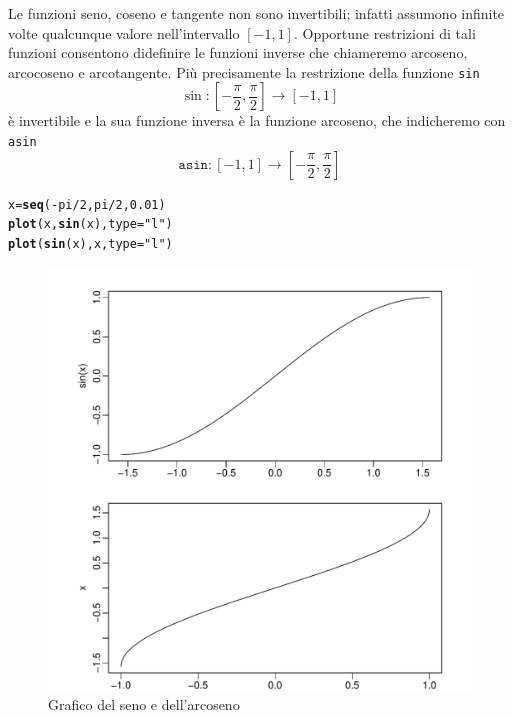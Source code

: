 \documentclass[onecolumn,11pt]{book}\usepackage[]{graphicx}\usepackage[]{color}
\makeatletter
\def\maxwidth{ %
  \ifdim\Gin@nat@width>\linewidth
    \linewidth
  \else
    \Gin@nat@width
  \fi
}
\newcommand{\hlnum}[1]{\textcolor[rgb]{0.686,0.059,0.569}{#1}}%
\newcommand{\hlstr}[1]{\textcolor[rgb]{0.192,0.494,0.8}{#1}}%
\newcommand{\hlopt}[1]{\textcolor[rgb]{0,0,0}{#1}}%
\newcommand{\hlstd}[1]{\textcolor[rgb]{0.345,0.345,0.345}{#1}}%
\newcommand{\hlkwb}[1]{\textcolor[rgb]{0.69,0.353,0.396}{#1}}%
\newcommand{\hlkwc}[1]{\textcolor[rgb]{0.333,0.667,0.333}{#1}}%
\newcommand{\hlkwd}[1]{\textcolor[rgb]{0.737,0.353,0.396}{\textbf{#1}}}%
\newenvironment{kframe}{%
 \def\at@end@of@kframe{}%
 \ifinner\ifhmode%
  \def\at@end@of@kframe{\end{minipage}}%
  \begin{minipage}{\columnwidth}%
 \fi\fi%
 \def\FrameCommand##1{\hskip\@totalleftmargin \hskip-\fboxsep
 \colorbox{shadecolor}{##1}\hskip-\fboxsep
     \hskip-\linewidth \hskip-\@totalleftmargin \hskip\columnwidth}%
 \MakeFramed {\advance\hsize-\width
   \@totalleftmargin\z@ \linewidth\hsize
   \@setminipage}}%
 {\par\unskip\endMakeFramed%
 \at@end@of@kframe}
\newenvironment{knitrout}{}{} %
\makeatother
\begin{document}
Le funzioni seno, coseno e tangente non sono invertibili; infatti assumono infinite volte qualcunque valore nell'intervallo $[-1,1]$.
Opportune restrizioni di tali funzioni consentono didefinire le funzioni inverse che chiameremo arcoseno, arcocoseno e arcotangente. Pi\`u precisamente
la restrizione della funzione \texttt{sin}
$$\sin\colon [-\frac{\pi}{2},\frac{\pi}{2}]\rightarrow [-1,1]$$
\`e invertibile e la sua funzione inversa \`e  la funzione arcoseno, che indicheremo con \texttt{asin}
$$\texttt{asin}\colon  [-1,1]\rightarrow [-\frac{\pi}{2},\frac{\pi}{2}]$$
\begin{knitrout}
\color{fgcolor}\begin{kframe}
\begin{alltt}
\hlstd{x}\hlkwb{=}\hlkwd{seq}\hlstd{(}\hlopt{-}\hlstd{pi}\hlopt{/}\hlnum{2}\hlstd{,pi}\hlopt{/}\hlnum{2}\hlstd{,}\hlnum{0.01}\hlstd{)}
\hlkwd{plot}\hlstd{(x,}\hlkwd{sin}\hlstd{(x),}\hlkwc{type}\hlstd{=}\hlstr{"l"}\hlstd{)}
\hlkwd{plot}\hlstd{(}\hlkwd{sin}\hlstd{(x),x,}\hlkwc{type}\hlstd{=}\hlstr{"l"}\hlstd{)}
\end{alltt}
\end{kframe}
\end{knitrout}
\begin{center}\begin{figure}

\begin{knitrout}
\color{fgcolor}
\includegraphics[width=\maxwidth]{figure/unnamed-chunk-101-1} 

\end{knitrout}
\caption{Grafico del seno e dell'arcoseno}
\end{figure}

\end{center}
\end{document}
